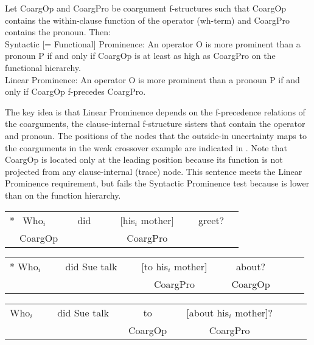 \documentclass[output=paper,hidelinks]{langscibook}
\begin{document}
\ea \label{DKT}
Let CoargOp and CoargPro be coargument f-structures such that CoargOp contains the within-clause function of the operator (wh-term) and CoargPro contains the pronoun. Then:\\[1ex]
Syntactic [= Functional] Prominence: An operator O is more prominent than a pronoun P if and only if CoargOp is at least as high as CoargPro on the functional hierarchy.\\[1ex]
Linear Prominence: An operator O is more prominent than a pronoun P if and only if CoargOp f-precedes CoargPro.
\z

\noindent The key idea is that Linear Prominence depends on the f-precedence relations of the coarguments, the clause-internal f-structure sisters that contain the operator and pronoun.  The positions of the nodes that the outside-in uncertainty maps to the coarguments in the weak crossover example  are indicated in . Note that CoargOp is located only at the leading position because its function \OBJ is not projected from any clause-internal (trace) node. This sentence meets the Linear Prominence requirement, but fails the Syntactic Prominence test because \OBJ is lower than \SUBJ on the function hierarchy.

\ea\label{coargweak}
\ea\label{coargweak1}
   \begin{tabular}[t]{@{}l@{}c@{}c@{}c@{}c@{}} 
            *  \ Who$_i$  &\ \ did\ \ \ \ &[his$_i$ mother] &\ \ \ greet?\\
              \small \ \            CoargOp             &         &         \small CoargPro                    
      \end{tabular}
\ex\label{coargweak2}
    \begin{tabular}[t]{@{}c@{}c@{}c@{}c@{}c@{}c@{}c@{}} 
          *  Who$_i$  &\ \ \ did Sue talk&\ \ \  [to his$_i$ mother]\ \ \  & about?\\
                             &                           &\small CoargPro              &  \small  CoargOp                    
      \end{tabular}
\ex\label{coargweak3}
    \begin{tabular}[t]{@{}c@{}c@{}c@{}c@{}c@{}c@{}c@{}} 
          \phantom{*\ }Who$_i$  &\ \ \ did Sue talk & to                        & [about his$_i$ mother]?\\
                           &                       &\ \   \small CoargOp\  \    &   \small CoargPro                       
      \end{tabular}
\end{document}
